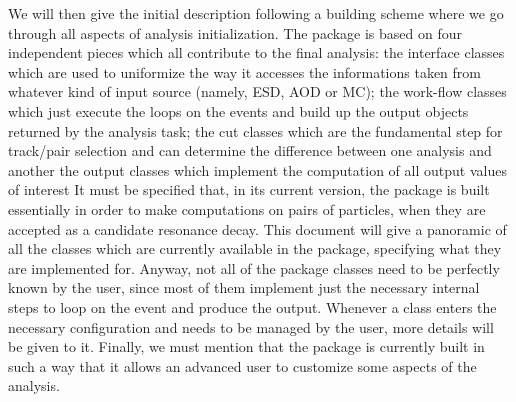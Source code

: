 \documentclass[12pt,a4paper]{article}
\begin{document}
We will then give the initial description following a building scheme where we go through all aspects of analysis initialization.
The package is based on four independent pieces which all contribute to the final analysis:
the interface classes which are used to uniformize the way it accesses the informations taken from whatever kind of input source (namely, ESD, AOD or MC);
the work-flow classes which just execute the loops on the events and build up the output objects returned by the analysis task;
the cut classes which are the fundamental step for track/pair selection and can determine the difference between one analysis and another
the  output classes which implement the computation of all output values of interest
It must be specified that, in its current version, the package is built essentially in order to make computations on pairs of particles, when they are accepted as a candidate resonance decay.
This document will give a panoramic of all the classes which are currently available in the package, specifying what they are implemented for. Anyway, not all of the package classes need to be perfectly known by the user, since most of them implement just the necessary internal steps to loop on the event and produce the output. Whenever a class enters the necessary configuration and needs to be managed by the user, more details will be given to it.
Finally, we must mention that the package is currently built in such a way that it allows an advanced user to customize some aspects of the analysis.
\end{document}
